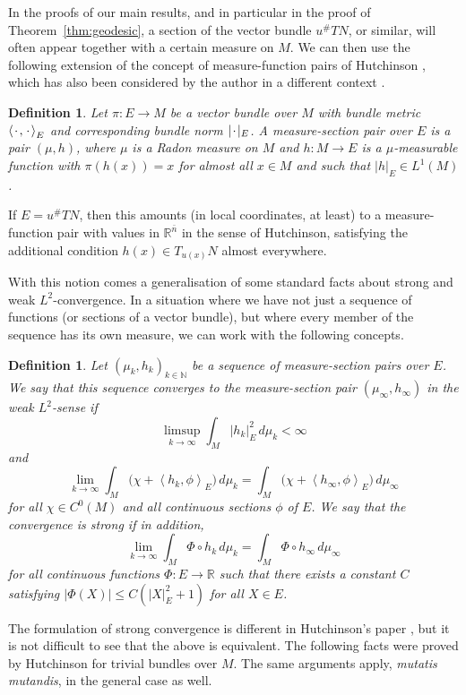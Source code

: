 \documentclass[10pt,a4paper]{amsart}
\newcommand{\R}{\mathbb{R}}
\newcommand{\N}{\mathbb{N}}
\newcommand{\ndim}{{\bar{n}}}
\newcommand{\blank}{{\mkern 2mu\cdot\mkern 2mu}}
\newcommand{\scp}[2]{\left\langle #1, #2 \right\rangle}
\newtheorem{definition}[theorem]{Definition}
\begin{document}
In the proofs of our main results, and in particular in the proof of Theorem~\ref{thm:geodesic}, a section of the vector bundle $u^\# TN$, or similar, will
often appear together with a certain measure on $M$. We can then use the following extension of the concept of measure-function pairs of Hutchinson \cite{Hutchinson:86}, which has also been considered by the
author in a different context \cite{Moser:15.2}.

\begin{definition}
Let $\pi \colon E \to M$ be a vector bundle over $M$ with bundle metric
$\scp{\blank}{\blank}_E$ and corresponding bundle norm $|\blank|_E$.
A \emph{measure-section pair} over $E$ is a pair
$(\mu, h)$, where $\mu$ is a Radon measure on $M$ and $h \colon M \to E$
is a $\mu$-measurable function with $\pi(h(x)) = x$ for almost all $x \in M$
and such that $|h|_E \in L^1(M)$.
\end{definition}

If $E = u^\# TN$, then this amounts (in local coordinates, at least) to a measure-function
pair with values in $\R^\ndim$ in the sense of Hutchinson,
satisfying the additional condition $h(x) \in T_{u(x)} N$ almost everywhere.

With this notion comes a generalisation of some standard facts about strong and weak $L^2$-convergence.
In a situation where we have not just a sequence of functions (or sections of a
vector bundle), but where every member of the sequence has its own measure, we can work with the following concepts.

\begin{definition}
Let $(\mu_k, h_k)_{k \in \N}$ be a sequence of measure-section pairs over $E$.
We say that this sequence converges to the measure-section pair $(\mu_\infty, h_\infty)$ in the \emph{weak $L^2$-sense} if
\[
\limsup_{k \to \infty} \int_M |h_k|_E^2 \, d\mu_k < \infty
\]
and
\[
\lim_{k \to \infty} \int_ M \bigl(\chi + \scp{h_k}{\phi}_E\bigr) \, d\mu_k = \int_ M \bigl(\chi + \scp{h_\infty}{\phi}_E\bigr) \, d\mu_\infty
\]
for all $\chi \in C^0(M)$ and all continuous sections $\phi$ of $E$.
We say that the convergence is \emph{strong} if in addition,
\[
\lim_{k \to \infty} \int_M \Phi \circ h_k \, d\mu_k = \int_M \Phi \circ h_\infty \, d\mu_\infty
\]
for all continuous functions $\Phi \colon E \to \R$ such that there exists a
constant $C$ satisfying $|\Phi(X)| \le C(|X|_E^2 + 1)$ for all $X \in E$.
\end{definition}

The formulation of strong convergence is different in Hutchinson's paper \cite{Hutchinson:86},
but it is not difficult to see that the above is equivalent.
The following facts were proved by Hutchinson \cite[Theorem 4.4.2]{Hutchinson:86}
for trivial bundles over $M$. The same arguments apply,
\emph{mutatis mutandis}, in the general case as well.
\end{document}
